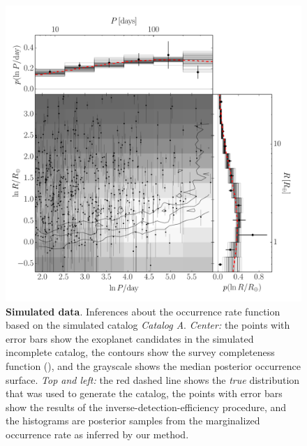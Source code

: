 \documentclass[12pt,preprint]{aastex}
\newcommand{\figlabel}[1]{\label{fig:#1}}
\newcommand{\modela}{\emph{Catalog A}}
\begin{document}
\begin{figure}[p]
\begin{center}
\includegraphics[width=\textwidth]{figures/smooth/results.pdf}
\end{center}
\caption{%
{\bf Simulated data}.
Inferences about the occurrence rate function based on the simulated catalog
\modela.
\emph{Center:} the points with error bars show the exoplanet candidates in the
simulated incomplete catalog, the contours show the survey completeness
function (\citealt{petigura}), and the grayscale shows the median posterior
occurrence surface.
\emph{Top and left:} the red dashed line shows the \emph{true} distribution
that was used to generate the catalog, the points with error bars show the
results of the inverse-detection-efficiency procedure, and the histograms are
posterior samples from the marginalized occurrence rate as inferred by our
method.
\figlabel{smooth-results}}
\end{figure}
\end{document}

